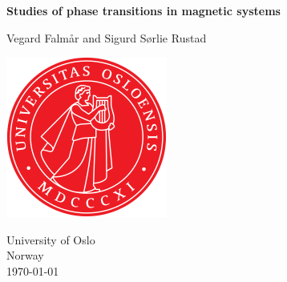\documentclass[reprint, english,notitlepage,nofootinbib]{revtex4-1}  %
\begin{document}
\begin{titlepage}
	\begin{center}
	\textbf{Studies of phase transitions in magnetic systems}

	\vspace{0.2cm}
	Vegard Falmår and Sigurd Sørlie Rustad

	\vspace{0.5cm}
	\includegraphics[scale=0.5]{../../pictures/UIO}
	\vspace{0.8cm}

	University of Oslo\\
	Norway\\
	\today	\\
	\end{center}
	\tableofcontents
	\clearpage
\end{titlepage}
\end{document}
